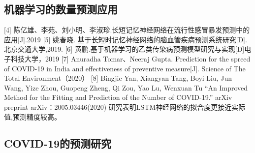 \documentclass[lang=cn,11pt,a4paper,cite=authoryear]{elegantpaper}
\begin{document}
\subsection{机器学习的数量预测应用}

[4] 陈亿雄、李苑、刘小明、李淑珍.长短记忆神经网络在流行性感冒暴发预测中的应用[J].2019
[5] 姚春晓. 基于长短时记忆神经网络的脑血管疾病预测系统研究[D].北京交通大学,2019.
[6] 黄鹏.基于机器学习的乙类传染病预测模型研究与实现[D]电子科技大学，2019
[7] Anuradha Tomar、Neeraj Gupta. Prediction for the spreed of COVID-19 in India and effectiveness of preventive measure[J]. Science of The Total Environment（2020）
[8] Bingjie Yan, Xiangyan Tang, Boyi Liu, Jun Wang, Yize Zhou, Guopeng Zheng, Qi Zou, Yao Lu, Wenxuan Tu “An Improved Method for the Fitting and Prediction of the Number of COVID-19.” arXiv preprint arXiv：2005.03446(2020)
研究表明LSTM神经网络的拟合度更接近实际值,预测精度较高。

\subsection{COVID-19的预测研究}
\end{document}
